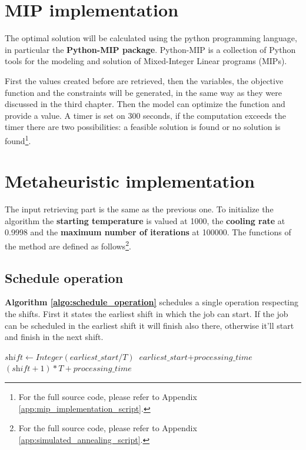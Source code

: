 \section[MIP implementation]{MIP implementation}

The optimal solution will be calculated using the python programming language, in particular the \textbf{Python-MIP package}. Python-MIP is a collection of Python tools for the modeling and solution of Mixed-Integer Linear programs (MIPs).

First the values created before are retrieved, then the variables, the objective function and the constraints will be generated, in the same way as they were discussed in the third chapter. Then the model can optimize the function and provide a value. A timer is set on 300 seconds, if the computation exceeds the timer there are two possibilities: a feasible solution is found or no solution is found\footnote{For the full source code, please refer to Appendix \ref{app:mip_implementation_script}.}. 

\section[Metaheuristic implementation]{Metaheuristic implementation}

The input retrieving part is the same as the previous one. To initialize the algorithm the \textbf{starting temperature} is valued at 1000, the \textbf{cooling rate} at 0.9998 and the \textbf{maximum number of iterations} at 100000. The functions of the method are defined as follows\footnote{For the full source code, please refer to Appendix \ref{app:simulated_annealing_script}.}.

\newpage
\subsection{Schedule operation}

\textbf{Algorithm \ref{algo:schedule_operation}} schedules a single operation respecting the shifts. First it states the earliest shift in which the job can start. If the job can be scheduled in the earliest shift it will finish also there, otherwise it'll start and finish in the next shift.

\begin{algorithm}[!htbp]
\caption{Schedule operation}
\label{algo:schedule_operation}
\begin{algorithmic}[1]

    \Statex
        \Statex
        \State $\textit{shift} \gets \textit{Integer}(\textit{earliest\_start} / T)$
        \Statex
            \State \Return $\textit{earliest\_start} + \textit{processing\_time}$
        \Else
            \State \Return $(\textit{shift} + 1) * T + \textit{processing\_time}$
        \EndIf
    \EndFunction

\end{algorithmic}
\end{algorithm}


